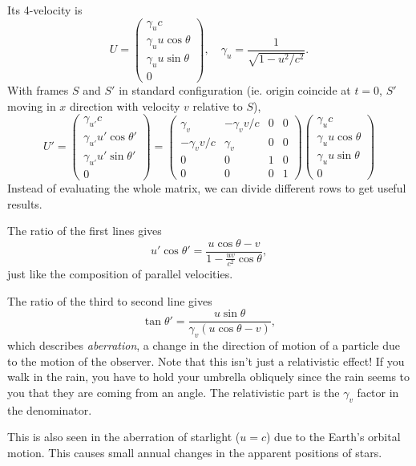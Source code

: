 \documentclass[a4paper]{article}
\begin{document}
Its 4-velocity is
\[
  U =
  \begin{pmatrix}
    \gamma_u c\\
    \gamma_u u\cos \theta\\
    \gamma_u u\sin \theta\\
    0
  \end{pmatrix}, \quad \gamma_u = \frac{1}{\sqrt{1 - u^2/c^2}}.
\]
With frames $S$ and $S'$ in standard configuration (ie. origin coincide at $t = 0$, $S'$ moving in $x$ direction with velocity $v$ relative to $S$),
\[
  U' = \begin{pmatrix}
    \gamma_{u'} c\\
    \gamma_{u'} u'\cos \theta'\\
    \gamma_{u'} u'\sin \theta'\\
    0
  \end{pmatrix}
  =
  \begin{pmatrix}
    \gamma_v & -\gamma_v v/c & 0 & 0\\
    -\gamma_{v} v/c & \gamma_v & 0 & 0\\
    0 & 0 & 1 & 0\\
    0 & 0 & 0 & 1
  \end{pmatrix}
  \begin{pmatrix}
    \gamma_u c\\
    \gamma_u u\cos \theta\\
    \gamma_u u\sin \theta\\
    0
  \end{pmatrix}
\]
Instead of evaluating the whole matrix, we can divide different rows to get useful results.

The ratio of the first lines gives
\[
  u'\cos \theta' = \frac{u\cos \theta - v}{1 - \frac{uv}{c^2}\cos \theta},
\]
just like the composition of parallel velocities.

The ratio of the third to second line gives
\[
  \tan \theta' = \frac{u\sin \theta}{\gamma_v(u\cos \theta - v)},
\]
which describes \emph{aberration}, a change in the direction of motion of a particle due to the motion of the observer. Note that this isn't just a relativistic effect! If you walk in the rain, you have to hold your umbrella obliquely since the rain seems to you that they are coming from an angle. The relativistic part is the $\gamma_v$ factor in the denominator.

This is also seen in the aberration of starlight ($u = c$) due to the Earth's orbital motion. This causes small annual changes in the apparent positions of stars.
\end{document}
